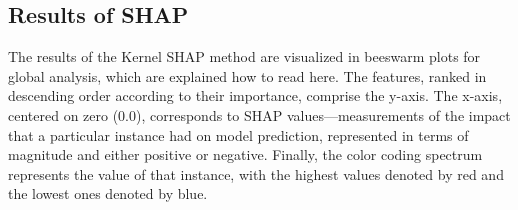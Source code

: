 \documentclass[12pt,a4paper]{article}
\numberwithin{figure}{section}
\numberwithin{table}{section}
\numberwithin{definition}{section}
\begin{document}
\subsection{Results of SHAP}
\label{ssec:shapresults}


The results of the Kernel SHAP method are visualized in beeswarm plots for global analysis, which are explained how to read here. The features, ranked in descending order according to their importance, comprise the y-axis. The x-axis, centered on zero (0.0), corresponds to SHAP values---measurements of the impact that a particular instance had on model prediction, represented in terms of magnitude and either positive or negative. Finally, the color coding spectrum represents the value of that instance, with the highest values denoted by red and the lowest ones denoted by blue.
\end{document}
